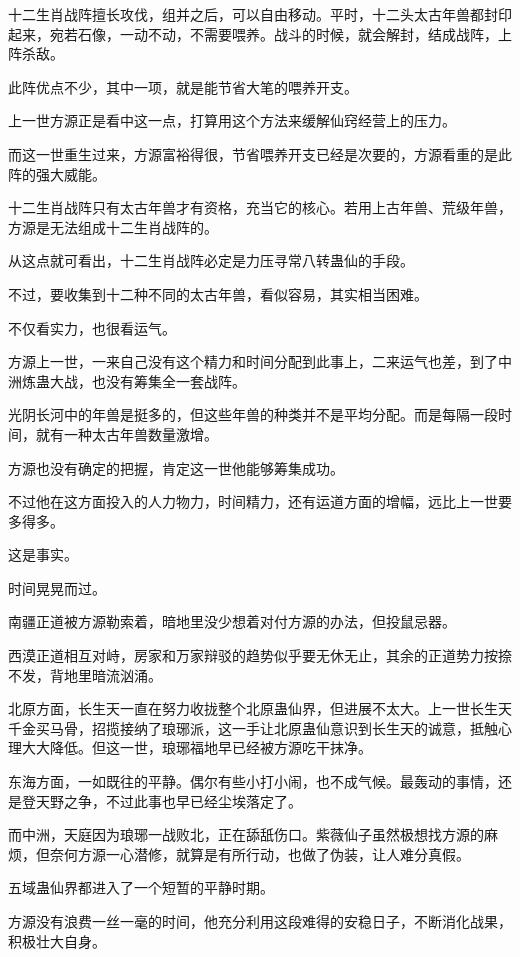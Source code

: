 \begin{this_body}
十二生肖战阵擅长攻伐，组并之后，可以自由移动。平时，十二头太古年兽都封印起来，宛若石像，一动不动，不需要喂养。战斗的时候，就会解封，结成战阵，上阵杀敌。

此阵优点不少，其中一项，就是能节省大笔的喂养开支。

上一世方源正是看中这一点，打算用这个方法来缓解仙窍经营上的压力。

而这一世重生过来，方源富裕得很，节省喂养开支已经是次要的，方源看重的是此阵的强大威能。

十二生肖战阵只有太古年兽才有资格，充当它的核心。若用上古年兽、荒级年兽，方源是无法组成十二生肖战阵的。

从这点就可看出，十二生肖战阵必定是力压寻常八转蛊仙的手段。

不过，要收集到十二种不同的太古年兽，看似容易，其实相当困难。

不仅看实力，也很看运气。

方源上一世，一来自己没有这个精力和时间分配到此事上，二来运气也差，到了中洲炼蛊大战，也没有筹集全一套战阵。

光阴长河中的年兽是挺多的，但这些年兽的种类并不是平均分配。而是每隔一段时间，就有一种太古年兽数量激增。

方源也没有确定的把握，肯定这一世他能够筹集成功。

不过他在这方面投入的人力物力，时间精力，还有运道方面的增幅，远比上一世要多得多。

这是事实。

时间晃晃而过。

南疆正道被方源勒索着，暗地里没少想着对付方源的办法，但投鼠忌器。

西漠正道相互对峙，房家和万家辩驳的趋势似乎要无休无止，其余的正道势力按捺不发，背地里暗流汹涌。

北原方面，长生天一直在努力收拢整个北原蛊仙界，但进展不太大。上一世长生天千金买马骨，招揽接纳了琅琊派，这一手让北原蛊仙意识到长生天的诚意，抵触心理大大降低。但这一世，琅琊福地早已经被方源吃干抹净。

东海方面，一如既往的平静。偶尔有些小打小闹，也不成气候。最轰动的事情，还是登天野之争，不过此事也早已经尘埃落定了。

而中洲，天庭因为琅琊一战败北，正在舔舐伤口。紫薇仙子虽然极想找方源的麻烦，但奈何方源一心潜修，就算是有所行动，也做了伪装，让人难分真假。

五域蛊仙界都进入了一个短暂的平静时期。

方源没有浪费一丝一毫的时间，他充分利用这段难得的安稳日子，不断消化战果，积极壮大自身。


\end{this_body}
